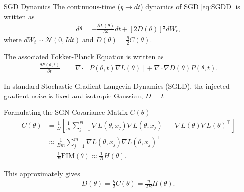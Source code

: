 \documentclass{beamer}
\begin{document}
\begin{frame}{SGD Dynamics}
    The continuous-time ($\eta \to dt$) dynamics of SGD \eqref{eq:SGDD} is written as
    \begin{align*}
    d \theta = -  \frac{\partial L(\theta)}{\partial \theta} dt +  [2D(\theta)]^{\frac{1}{2}}  dW_{t},
    \end{align*}
    where $d W_{t} \sim  \mathcal{N}(0,Idt)$ and $D(\theta) = \frac{\eta}{2} C(\theta)$. 

\vspace{3mm}

    The associated Fokker-Planck Equation is written as
\begin{align}
\label{eq:FP}
 \frac{\partial P(\theta, t)}{\partial t}  = &   \nabla \cdot [P(\theta, t) \nabla L(\theta) ]  + \nabla \cdot \nabla D(\theta)  P(\theta, t) .
\end{align}

\vspace{3mm}

In standard Stochastic Gradient Langevin Dynamics (SGLD), the injected gradient noise is fixed and isotropic Gaussian, $D = I$.
\end{frame}

\begin{frame}{Formulating the SGN Covariance Matrix $C(\theta)$}
    \begin{align*}
    C(\theta) 
    &= \frac{1}{B} \left[\frac{1}{m} \sum_{j=1}^{m}  \nabla L(\theta, x_{j})  \nabla L(\theta, x_{j})^{\top} -  \nabla L(\theta)  \nabla L(\theta)^{\top}\right] 
    \\&\approx \frac{1}{Bm} \sum_{j=1}^{m}  \nabla L(\theta, x_{j})  \nabla L(\theta, x_{j})^{\top}
    \\&=
    \frac{1}{B} \mathrm{FIM}(\theta) \approx  \frac{1}{B} H(\theta). 
    \end{align*}

    \vspace{3mm}

    This approximately gives
    \begin{align*}
    D(\theta)  = \frac{\eta}{2} C(\theta)  =  \frac{\eta }{2 B} H(\theta).
    \end{align*}
\end{frame}
\end{document}

